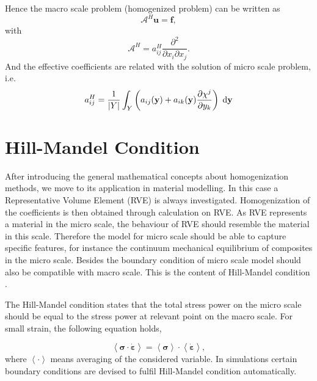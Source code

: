 Hence the macro scale problem (homogenized problem) can be written as
\begin{equation}
\mathcal{A}^{H} \mathbf{u} = \mathbf{f},
\end{equation}
with
\begin{equation}
\mathcal{A}^{H} = a^{H}_{ij} \dfrac{\partial^{2}}{\partial x_{i} \partial x_{j}}.
\end{equation}
%
And the effective coefficients are related with the solution of micro scale problem, i.e.
\begin{equation}
a^{H}_{ij} = \dfrac{1}{|Y|} \int_{Y} \left( a_{ij}(\mathbf{y}) + a_{ik}(\mathbf{y}) \dfrac{\partial \chi^{j}}{\partial y_{k}} \right) \;\mathrm{d}{\mathbf{y}}
\end{equation}

\section{Hill-Mandel Condition}
After introducing the general mathematical concepts about homogenization methods, we move to its application in material modelling. In this case a Representative Volume Element (RVE) is always investigated. Homogenization of the coefficients is then obtained through calculation on RVE. As RVE represents a material in the micro scale, the behaviour of RVE should resemble the material in this scale. Therefore the model for micro scale should be able to capture specific features, for instance the continuum mechanical equilibrium of composites in the micro scale. Besides the boundary condition of micro scale model should also be compatible with macro scale. This is the content of  Hill-Mandel condition \citep{gluge2012comparison}.

The Hill-Mandel condition states that the total stress power on the micro scale should be equal to the stress power at relevant point on the macro scale. For small strain, the following equation holds,

\begin{equation}
\left< \bm{\sigma} \cdot \dot{\bm{\varepsilon}} \right> = \left< \bm{\sigma} \right> \cdot \left< \dot{\bm{\varepsilon}} \right>,
\end{equation}
where $\left< \cdot \right>$ means averaging of the considered variable. In simulations certain boundary conditions are devised to fulfil Hill-Mandel condition automatically. 

%
%

%
%
%
%
%
%
%
%
%
%
%
%
%
%
%
%
%
%
%
%
